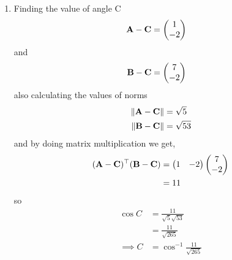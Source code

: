 \documentclass[11pt]{book}
\begin{document}
\begin{enumerate}[label=\thesection.\arabic*.,ref=\thesection.\theenumi]
\begin{enumerate}
\item Finding the value of angle C
\begin{align}
	\mathbf{A}-\mathbf{C} &=\begin{pmatrix}1\\-2\end{pmatrix}
\end{align}
and 
\begin{align}
	\mathbf{B}-\mathbf{C}&= \begin{pmatrix}7\\-2\end{pmatrix}
\end{align}
also calculating the values of norms
\begin{align}
	\left\lVert\mathbf{A}-\mathbf{C}\right\rVert &= \sqrt{5}\\
	\left\lVert\mathbf{B}-\mathbf{C}\right\rVert &= \sqrt{53}
\end{align}
and by doing matrix multiplication we get,
\begin{align}
\begin{split}
	(\mathbf{A}-\mathbf{C})^{\top}(\mathbf{B}-\mathbf{C})&=\begin{pmatrix}1&-2\end{pmatrix}\begin{pmatrix}7\\-2\end{pmatrix}\\
	&=11
\end{split}
\end{align}
so 
\begin{align}
	\cos{C}&= \frac{11}{\sqrt{5} \sqrt{53}}\\
	&= \frac{11}{\sqrt{265}}\\
	\implies C&=\cos^{-1}{\frac{11}{\sqrt{265}}}
\end{align}
\end{enumerate}


\end{enumerate}






%
\end{document}
